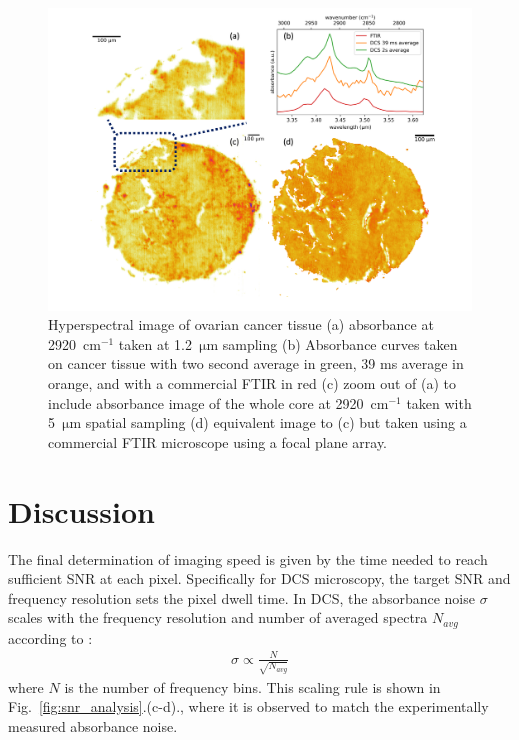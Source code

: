 \documentclass{optica-article}
\begin{document}
\begin{figure}[h]
    \centering
    \includegraphics[width=\linewidth]{bio_image_w_FTIR_comparison.png}
    \caption{Hyperspectral image of ovarian cancer tissue (a) absorbance at \mbox{2920 $\mathrm{cm^{-1}}$} taken at \mbox{1.2 $\mathrm{\mu m}$} sampling (b) Absorbance curves taken on cancer tissue with two second average in green, 39 ms average in orange, and with a commercial FTIR in red (c) zoom out of (a) to include absorbance image of the whole core at \mbox{2920 $\mathrm{cm^{-1}}$} taken with \mbox{5 $\mathrm{\mu m}$} spatial sampling (d) equivalent image to (c) but taken using a commercial FTIR microscope using a focal plane array.}
    \label{fig:bio}
\end{figure}

\section{Discussion}
The final determination of imaging speed is given by the time needed to reach sufficient SNR at each pixel. Specifically for DCS microscopy, the target SNR and frequency resolution sets the pixel dwell time. In DCS, the absorbance noise $\sigma$ scales with the frequency resolution and number of averaged spectra $N_{avg}$ according to \cite{newburySensitivityCoherentDualcomb2010}: 
% 
\begin{align}
    \sigma \propto \frac{N}{\sqrt{N_{avg}}}
    \label{eq:snr}
\end{align}
% 
where $N$ is the number of frequency bins. This scaling rule is shown in \mbox{Fig. \ref{fig:snr_analysis}.(c-d).}, where it is observed to match the experimentally measured absorbance noise. 
\end{document}

